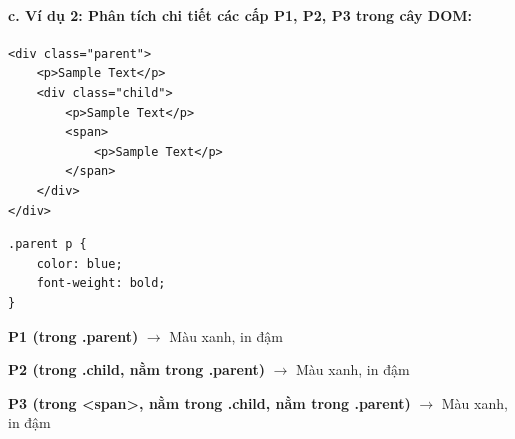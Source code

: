 \documentclass[11pt,oneside]{book}
\begin{document}
\paragraph{c. Ví dụ 2: Phân tích chi tiết các cấp P1, P2, P3 trong cây DOM:}
\begin{codeWindow}
\begin{lstlisting}[language=HTML5]
<div class="parent">
    <p>Sample Text</p>
    <div class="child">
        <p>Sample Text</p>
        <span>
            <p>Sample Text</p>
        </span>
    </div>
</div>
\end{lstlisting}

\begin{lstlisting}[language=CSS3]
.parent p {
    color: blue;
    font-weight: bold;
}
\end{lstlisting}
\end{codeWindow}

\begin{browserWindow}
\sffamily\small
\textcolor{primaryBlue}{\textbf{P1 (trong .parent)}} $\rightarrow$ Màu xanh, in đậm \par\vspace{2pt}
\textcolor{primaryBlue}{\textbf{P2 (trong .child, nằm trong .parent)}} $\rightarrow$ Màu xanh, in đậm \par\vspace{2pt}
\textcolor{primaryBlue}{\textbf{P3 (trong <span>, nằm trong .child, nằm trong .parent)}} $\rightarrow$ Màu xanh, in đậm
\end{browserWindow}
\end{document}
